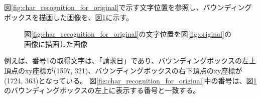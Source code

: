 図\ref{fig:char_recognition_for_original}で示す文字位置を参照し、バウンディングボックスを描画した画像を、図\ref{fig:bbox_recognition_for_original}に示す。
\begin{figure}[tp]
    \begin{center}
        \caption{図\ref{fig:char_recognition_for_original}の文字位置を図\ref{fig:original}の画像に描画した画像}
        \label{fig:bbox_recognition_for_original}
    \end{center}
\end{figure}
例えば、番号1の取得文字は、「請求日」であり、バウンディングボックスの左上頂点のxy座標が(1597, 321)、バウンディングボックスの右下頂点のxy座標が(1724, 363)となっている。
図\ref{fig:char_recognition_for_original}中の番号は、図\ref{fig:bbox_recognition_for_original}のバウンディングボックスの左上に表示する番号と一致する。

